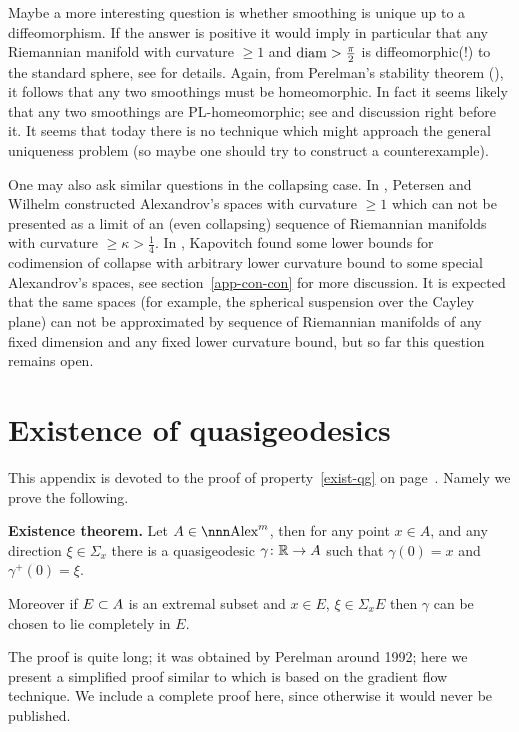 \documentclass{article}
\begin{document}
Maybe a more interesting question is whether smoothing is unique up to a diffeomorphism. 
If the answer is positive it would imply in particular that any Riemannian
manifold with curvature $\ge 1$ and $\operatorname{diam}>\tfrac\pi2$ is diffeomorphic(!) to the
standard sphere, see \cite{grove:grove's-question} for details.
Again, from Perelman's stability theorem (\cite{perelman:spaces2}), it follows that any two smoothings must be homeomorphic. 
In fact it seems likely that any two smoothings are PL-homeomorphic; see
\cite[question 1.3]{kapovitch:stability} and discussion right before it.
It seems that today there is no technique which might approach the general uniqueness 
problem (so maybe one should try to construct a counterexample).

One may also ask similar questions in the collapsing case.
In \cite{spher-susp-W},
Petersen and Wilhelm constructed Alexandrov's spaces with curvature $\ge1$ which can not be presented as a limit of an (even collapsing) sequence of Riemannian manifolds with curvature
$\ge \kappa>\tfrac14$. 
In \cite{kapovitch:collapsing}, Kapovitch found some lower bounds for codimension of collapse with arbitrary lower curvature bound to some special Alexandrov's spaces, see section~\ref{app-con-con} for more discussion.
It is expected that the same spaces (for example, the spherical suspension over the Cayley plane) can not be approximated by sequence of
Riemannian manifolds of any fixed dimension and any fixed lower curvature bound, but so far this question remains open.






\appendix\section{Existence of quasigeodesics}
\label{constr-qg}
\setcounter{thm}{0}


This appendix is devoted to the proof of property~\ref{exist-qg} on
page~\pageref{exist-qg}. 
Namely we prove the following.

\begin{thm}\label{thm:exist-qg}{\bf Existence theorem.}
Let $A\in\Alex^m$, then for any point $x\in A$, and any direction $\xi\in \Sigma_x$
there is a quasigeodesic $\gamma\colon\mathbb{R}\to A$ such that $\gamma(0)=x$ and
$\gamma^+(0)=\xi$.

Moreover if $E\subset A$ is an extremal subset and $x\in E$, $\xi\in \Sigma_x E$
then $\gamma$ can be chosen to lie completely in $E$.
\end{thm}
The proof is quite long; it was obtained by Perelman around 1992;
here we present a simplified proof similar to \cite{perelman-petrunin:qg} which is
based on the gradient flow technique. 
We include a complete proof here, since otherwise it would never be published.
\end{document}
